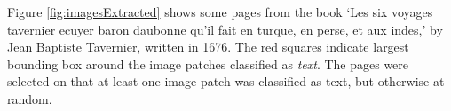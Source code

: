

Figure \ref{fig:imagesExtracted} shows some pages from the book `Les six voyages
tavernier ecuyer baron daubonne qu'il fait en turque, en perse, et aux indes,'
by Jean Baptiste Tavernier, written in 1676. The red squares indicate largest
bounding box around the image patches classified as \emph{text}. The pages were
selected on that at least one image patch was classified as text, but otherwise
at random.

